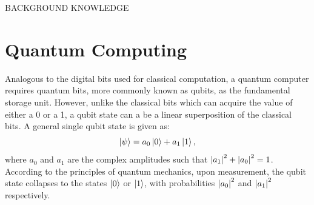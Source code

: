 \documentclass[12]{article}
\begin{document}
\begin{center}
\begin{Huge}
BACKGROUND KNOWLEDGE
\end{Huge}
\end{center}
\section{Quantum Computing}
Analogous to the digital bits used for classical computation, a quantum computer requires quantum bits, more commonly known as qubits, as the fundamental storage unit. However, unlike the classical bits which can acquire the value of either a 0 or a 1, a qubit state can a be a linear superposition of the classical bits. A general single qubit state is given as:
\begin{equation}
\ket{\psi}= a_0 \ket{0} + a_1 \ket{1},  \label{eq:b1}
\end{equation}
where $a_0$ and $a_1$ are the complex amplitudes such that ${\abs{a_1}}^2 +{\abs{a_0}}^2 =1$. According to the principles of quantum mechanics, upon measurement, the qubit state collapses to the states $\ket{0}$ or $\ket{1}$, with probabilities ${\abs{a_0}}^2$ and ${\abs{a_1}}^2$ respectively. 
\end{document}
